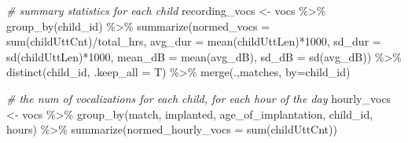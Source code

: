 \documentclass[
]{article}
\newenvironment{Shaded}{\begin{snugshade}}{\end{snugshade}}
\newcommand{\AttributeTok}[1]{\textcolor[rgb]{0.77,0.63,0.00}{#1}}
\newcommand{\CommentTok}[1]{\textcolor[rgb]{0.56,0.35,0.01}{\textit{#1}}}
\newcommand{\DecValTok}[1]{\textcolor[rgb]{0.00,0.00,0.81}{#1}}
\newcommand{\FunctionTok}[1]{\textcolor[rgb]{0.00,0.00,0.00}{#1}}
\newcommand{\NormalTok}[1]{#1}
\newcommand{\OtherTok}[1]{\textcolor[rgb]{0.56,0.35,0.01}{#1}}
\newcommand{\SpecialCharTok}[1]{\textcolor[rgb]{0.00,0.00,0.00}{#1}}
\newcommand{\StringTok}[1]{\textcolor[rgb]{0.31,0.60,0.02}{#1}}
\begin{document}
\begin{Shaded}
\begin{Highlighting}[]
\CommentTok{\# summary statistics for each child }
\NormalTok{recording\_vocs }\OtherTok{\textless{}{-}}\NormalTok{ vocs }\SpecialCharTok{\%\textgreater{}\%}
  \FunctionTok{group\_by}\NormalTok{(child\_id) }\SpecialCharTok{\%\textgreater{}\%}
  \FunctionTok{summarize}\NormalTok{(}\AttributeTok{normed\_vocs =} \FunctionTok{sum}\NormalTok{(childUttCnt)}\SpecialCharTok{/}\NormalTok{total\_hrs,}
            \AttributeTok{avg\_dur =} \FunctionTok{mean}\NormalTok{(childUttLen)}\SpecialCharTok{*}\DecValTok{1000}\NormalTok{,}
            \AttributeTok{sd\_dur =} \FunctionTok{sd}\NormalTok{(childUttLen)}\SpecialCharTok{*}\DecValTok{1000}\NormalTok{,}
            \AttributeTok{mean\_dB =} \FunctionTok{mean}\NormalTok{(avg\_dB),}
            \AttributeTok{sd\_dB =}  \FunctionTok{sd}\NormalTok{(avg\_dB)) }\SpecialCharTok{\%\textgreater{}\%}
  \FunctionTok{distinct}\NormalTok{(child\_id, }\AttributeTok{.keep\_all =}\NormalTok{ T) }\SpecialCharTok{\%\textgreater{}\%}
  \FunctionTok{merge}\NormalTok{(.,matches, }\AttributeTok{by=}\StringTok{\textquotesingle{}child\_id\textquotesingle{}}\NormalTok{)}

\CommentTok{\# the num of vocalizations for each child, for each hour of the day}
\NormalTok{hourly\_vocs }\OtherTok{\textless{}{-}}\NormalTok{ vocs }\SpecialCharTok{\%\textgreater{}\%}
  \FunctionTok{group\_by}\NormalTok{(match, implanted, age\_of\_implantation, child\_id, hours) }\SpecialCharTok{\%\textgreater{}\%} 
  \FunctionTok{summarize}\NormalTok{(}\AttributeTok{normed\_hourly\_vocs =} \FunctionTok{sum}\NormalTok{(childUttCnt))}


\end{Highlighting}
\end{Shaded}
\end{document}

